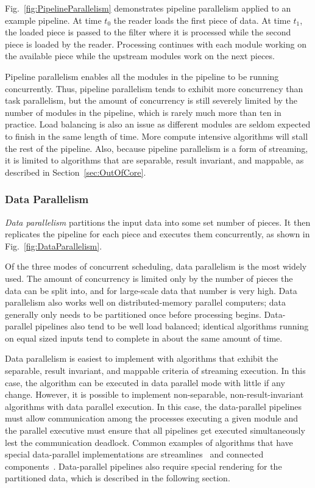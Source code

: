 \documentclass[journal,twocolumn,10pt,letterpaper,twoside]{IEEEtran}
\newcommand*{\lcite}[1]{~\cite{#1}}
\newcommand*{\figref}[1]{Fig.~\ref{#1}}
\newcommand*{\keyterm}[1]{\emph{#1}}
\begin{document}
\figref{fig:PipelineParallelism} demonstrates pipeline parallelism
applied to an example pipeline.  At time $t_0$ the reader loads the first
piece of data.  At time $t_1$, the loaded piece is passed to the filter
where it is processed while the second piece is loaded by the reader.
Processing continues with each module working on the available piece
while the upstream modules work on the next pieces.

Pipeline parallelism enables all the modules in the pipeline to be
running concurrently.  Thus, pipeline parallelism tends to exhibit more
concurrency than task parallelism, but the amount of concurrency is still
severely limited by the number of modules in the pipeline, which is
rarely much more than ten in practice.  Load balancing is also an issue as
different modules are seldom expected to finish in the same length of
time.  More compute intensive algorithms will stall the rest of the
pipeline.  Also, because pipeline parallelism is a form of streaming, it is
limited to algorithms that are separable, result invariant, and mappable,
as described in Section~\ref{sec:OutOfCore}.

\subsubsection{Data Parallelism}
\label{sec:DataParallelism}

\keyterm{Data parallelism} partitions the input data into some set number
of pieces.  It then replicates the pipeline for each piece and executes
them concurrently, as shown in \figref{fig:DataParallelism}.

Of the three modes of concurrent scheduling, data parallelism is the most
widely used.  The amount of concurrency is limited only by the number of
pieces the data can be split into, and for large-scale data that number is
very high.  Data parallelism also works well on distributed-memory parallel
computers; data generally only needs to be partitioned once before
processing begins.  Data-parallel pipelines also tend to be well load
balanced; identical algorithms running on equal sized inputs tend to
complete in about the same amount of time.

Data parallelism is easiest to implement with algorithms that exhibit the
separable, result invariant, and mappable criteria of streaming execution.
In this case, the algorithm can be executed in data parallel mode with
little if any change.  However, it is possible to implement non-separable,
non-result-invariant algorithms with data parallel execution.  In this
case, the data-parallel pipelines must allow communication among the
processes executing a given module and the parallel executive must
ensure that all pipelines get executed simultaneously lest the
communication deadlock.  Common examples of algorithms that have special
data-parallel implementations are streamlines\lcite{Pugmire2009} and
connected components\lcite{Moreland2008:UltraVis}.  Data-parallel pipelines
also require special rendering for the partitioned data, which is described
in the following section.
\end{document}
